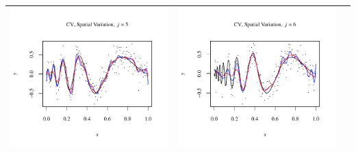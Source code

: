 \documentclass[11pt]{article}
\begin{document}
\begin{table}[h!]
\begin{center}
\begin{tabular}{| >{\centering\arraybackslash}m{2.1in} |  >{\centering\arraybackslash}m{2.1in} |  >{\centering\arraybackslash}m{2.1in}|}
      \includegraphics[width=1\linewidth,height=0.18\textheight]{Graphs/1/3/assignment5_a_1_3_5}&
      \includegraphics[width=1\linewidth,height=0.18\textheight]{Graphs/1/3/assignment5_a_1_3_6}\\\hline
    \end{tabular}
  \end{center}
\end{table}
\end{document}

